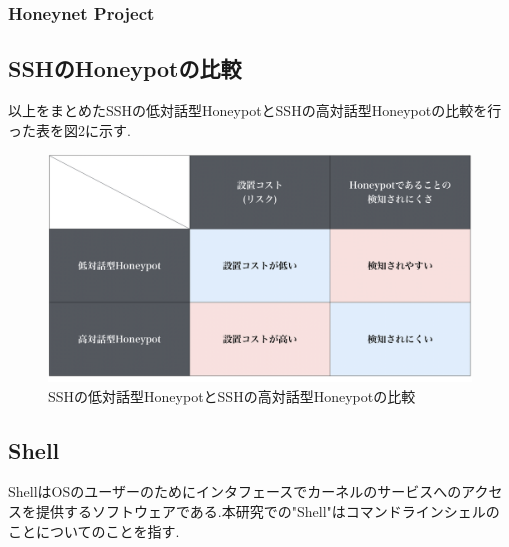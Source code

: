 \subsubsection{Honeynet Project}
\label{issue:Honeynet}

\subsection{SSHのHoneypotの比較}
\label{issue:CompareHoneypot}
以上をまとめたSSHの低対話型HoneypotとSSHの高対話型Honeypotの比較を行った表を図2に示す.

\vspace{10mm}
\begin{figure}[H]
    \centering
    \includegraphics[width=1.0\textwidth]{figures/compare.png}
    \caption{SSHの低対話型HoneypotとSSHの高対話型Honeypotの比較}
    \label{fig:evo}
\end{figure}


\subsection{Shell}
\label{issue:Shell}
ShellはOSのユーザーのためにインタフェースでカーネルのサービスへのアクセスを提供するソフトウェアである.本研究での"Shell"はコマンドラインシェルのことについてのことを指す.

